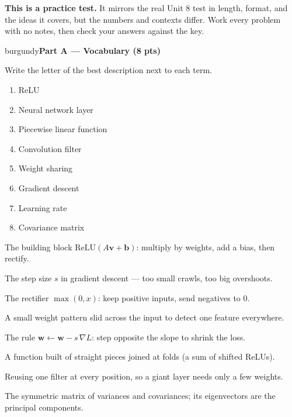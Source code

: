 \documentclass[10pt]{article}
\newcommand{\vv}{\mathbf{v}}
\newcommand{\bb}{\mathbf{b}}
\newcommand{\ww}{\mathbf{w}}
\newcommand{\relu}{\mathrm{ReLU}}
\newcommand{\parthead}[1]{%
  \vspace{6pt}\noindent
  \begin{headlinebox}{burgundy}{\color{white}\bfseries #1}\end{headlinebox}%
  \vspace{4pt}}
\begin{document}
\namedateperiod

\vspace{0.10in}
\begin{remindbox}
\small
\textbf{This is a practice test.} It mirrors the real Unit 8 test in length, format,
and the ideas it covers, but the numbers and contexts differ. Work every problem
with no notes, then check your answers against the key.
\end{remindbox}

\parthead{Part A --- Vocabulary (8 pts)}
Write the letter of the best description next to each term.

\vspace{4pt}
\noindent
\begin{minipage}[t]{0.40\textwidth}
\begin{enumerate}[leftmargin=2.2em, itemsep=7pt, label=\arabic*.]
  \item ReLU 
  \item Neural network layer 
  \item Piecewise linear function 
  \item Convolution filter 
  \item Weight sharing 
  \item Gradient descent 
  \item Learning rate 
  \item Covariance matrix 
\end{enumerate}
\end{minipage}%
\hfill
\begin{minipage}[t]{0.57\textwidth}
\small
\begin{description}[leftmargin=1.4em, itemsep=3pt]
  \item[(A)] The building block $\relu(A\vv+\bb)$: multiply by weights, add a bias, then rectify.
  \item[(B)] The step size $s$ in gradient descent --- too small crawls, too big overshoots.
  \item[(C)] The rectifier $\max(0,x)$: keep positive inputs, send negatives to $0$.
  \item[(D)] A small weight pattern slid across the input to detect one feature everywhere.
  \item[(E)] The rule $\ww\leftarrow\ww-s\,\nabla L$: step opposite the slope to shrink the loss.
  \item[(F)] A function built of straight pieces joined at folds (a sum of shifted ReLUs).
  \item[(G)] Reusing one filter at every position, so a giant layer needs only a few weights.
  \item[(H)] The symmetric matrix of variances and covariances; its eigenvectors are the principal components.
\end{description}
\end{minipage}
\end{document}

